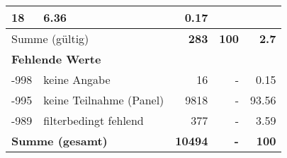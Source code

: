 \begin{longtable}{lXrrr}
       \num{18} &
       \num[round-mode=places,round-precision=2]{6.36} &
         \num[round-mode=places,round-precision=2]{0.17} \\
     \midrule
     \multicolumn{2}{l}{Summe (gültig)} &
       \textbf{\num{283}} &
     \textbf{\num{100}} &
       \textbf{\num[round-mode=places,round-precision=2]{2.7}} \\
     \multicolumn{5}{l}{\textbf{Fehlende Werte}}\\
       -998 &
       keine Angabe &
         \num{16} &
        - &
         \num[round-mode=places,round-precision=2]{0.15} \\
       -995 &
       keine Teilnahme (Panel) &
         \num{9818} &
        - &
         \num[round-mode=places,round-precision=2]{93.56} \\
       -989 &
       filterbedingt fehlend &
         \num{377} &
        - &
         \num[round-mode=places,round-precision=2]{3.59} \\
     \midrule
     \multicolumn{2}{l}{\textbf{Summe (gesamt)}} &
          \textbf{\num{10494}} &
        \textbf{-} &
        \textbf{\num{100}} \\
     \bottomrule
     \end{longtable}
     
